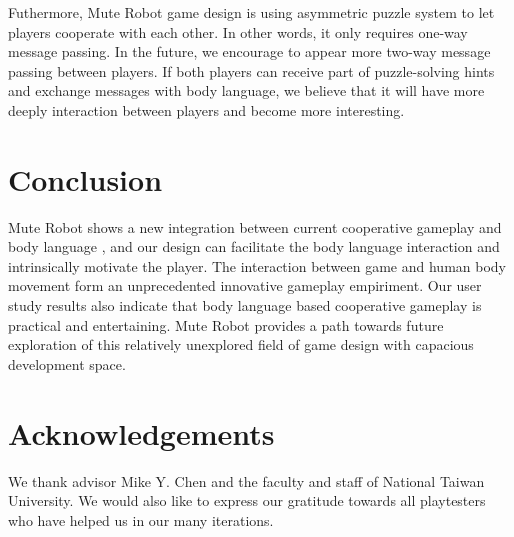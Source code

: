 \documentclass{chi-ext}
\begin{document}

Futhermore, Mute Robot game design is using asymmetric puzzle system to let players cooperate with each other. In other words, it only requires one-way message passing.
In the future, we encourage to appear more two-way message passing between players. 
If both players can receive part of puzzle-solving hints and exchange messages with body language, we believe that it will have more deeply interaction between players and become more interesting.


\section{Conclusion}
Mute Robot shows a new integration between current cooperative gameplay and body language
, and our design can facilitate the body language interaction and intrinsically motivate the player.
The interaction between game and human body movement form an unprecedented innovative gameplay empiriment.
Our user study results also indicate that body language based cooperative gameplay is practical and entertaining.
Mute Robot provides a path towards future exploration of this relatively unexplored field of game design with capacious development space.



\section{Acknowledgements}
We thank advisor Mike Y. Chen and the faculty and staff of National Taiwan University.
We would also like to express our gratitude towards all playtesters who have helped us in our many iterations. 



\balance


\end{document}
